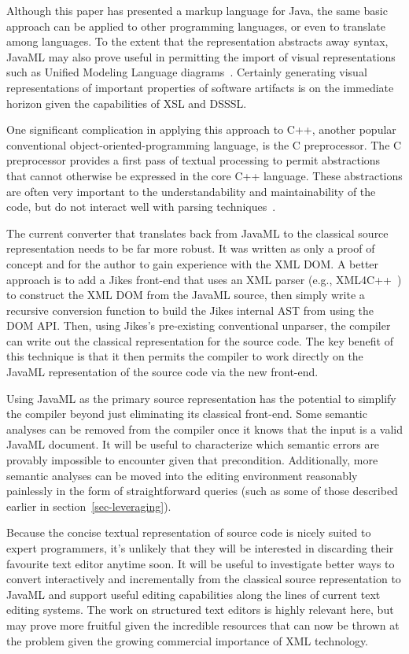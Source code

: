 \documentclass{article}
\begin{document}
\begin{multicols}{2}
Although this paper has presented a markup language for Java, the same
basic approach can be applied to other programming languages, or even to
translate among languages.  To the extent that the representation
abstracts away syntax, JavaML may also prove useful in permitting the
import of visual representations such as Unified Modeling Language
diagrams~\cite{UMLNutshell,XMI}.  Certainly generating visual
representations of important properties of software artifacts is on the
immediate horizon given the capabilities of XSL and DSSSL.

One significant complication in applying this approach to C++, another
popular conventional object-oriented-programming language, is the C
preprocessor.  The C preprocessor provides a first pass of textual
processing to permit abstractions that cannot otherwise be expressed in
the core C++ language.  These abstractions are often very important to
the understandability and maintainability of the code, but do not
interact well with parsing techniques~\cite{ErnstBadrosNotkin00,Badros00-spe}.

The current converter that translates back from JavaML to the classical
source representation needs to be far more robust.  It was written as
only a proof of concept and for the author to gain experience with the
XML DOM.  A better approach is to add a Jikes front-end that uses an XML
parser (e.g., XML4C++~\cite{XML4C++}) to construct the XML DOM from the
JavaML source, then simply write a recursive conversion function to
build the Jikes internal AST from using the DOM API.  Then, using
Jikes's pre-existing conventional unparser, the compiler can write out
the classical representation for the source code.  The key benefit of
this technique is that it then permits the compiler to work directly on
the JavaML representation of the source code via the new front-end.

Using JavaML as the primary source representation has the potential to
simplify the compiler beyond just eliminating its classical front-end.
Some semantic analyses can be removed from the compiler once it knows
that the input is a valid JavaML document.  It will be useful to
characterize which semantic errors are provably impossible to encounter
given that precondition.  Additionally, more semantic analyses can be
moved into the editing environment reasonably painlessly in the form of
straightforward queries (such as some of those described earlier in
section~\ref{sec-leveraging}).

Because the concise textual representation of source code is nicely
suited to expert programmers, it's unlikely that they will be interested
in discarding their favourite text editor anytime soon.  It will be
useful to investigate better ways to convert interactively and
incrementally from the classical source representation to JavaML and
support useful editing capabilities along the lines of current text
editing systems.  The work on structured text editors is highly relevant
here, but may prove more fruitful given the incredible resources that
can now be thrown at the problem given the growing commercial importance
of XML technology.


\end{multicols}
\end{document}
